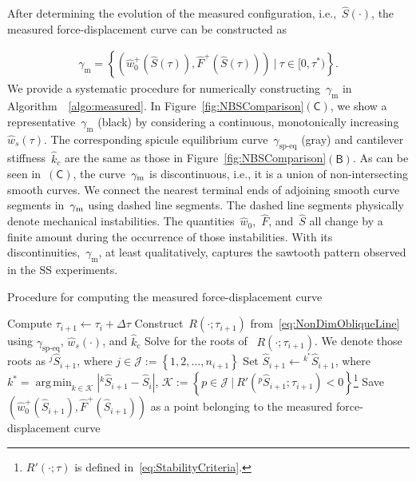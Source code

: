 \documentclass[preprint,10pt,times]{elsarticle}
\numberwithin{equation}{section}
\newcommand{\lsc}[2][\mathscr{l}]{{}^{ #1 }\! #2}
\newcommand{\pr}[1]{\left( #1 \right)}
\newcommand{\subf}[1]{\pr{\textsf{#1}}}
\DeclareMathOperator*{\argmin}{arg\,min} %
\begin{document}
After determining the evolution of the measured configuration, i.e.,~$\hat{S}\pr{\cdot}$,
the measured force-displacement curve can be constructed as

\begin{align}
\gamma_{\text{m}}=\left\{\pr{\hat{w}_0^{+}\pr{\hat{S}(\tau)},\hat{F}^{+}\pr{\hat{S}(\tau)}}~|~\tau\in [0,\tau^*)\right\}.
\label{eq:PredictedMeasuredCurve}
\end{align}We provide a systematic procedure for numerically constructing~$\gamma_{\text{m}}$
in Algorithm~~\ref{algo:measured}. In Figure~\ref{fig:NBSComparison}$\subf{C}$,
we show a representative~$\gamma_{\text{m}}$ (black) by considering
a continuous, monotonically increasing~$\hat{w}_s(\tau)$. The corresponding
spicule equilibrium curve~$\gamma_{\text{sp-eq}}$ (gray) and cantilever
stiffness~$\hat{k}_c$ are the same as those in Figure~\ref{fig:NBSComparison}$\subf{B}$.
As can be seen in~$\subf{C}$, the curve~$\gamma_{\rm m}$ is discontinuous,
i.e., it is a union of non-intersecting smooth curves. We connect
the nearest terminal ends of adjoining smooth curve segments in~$\gamma_{\rm m}$
using dashed line segments. The dashed line segments physically denote
mechanical instabilities. The quantities~$\hat{w}_0$,~$\hat{F}$,
and~$\hat{S}$ all change by a finite amount during the occurrence
of those instabilities. With its discontinuities,~$\gamma_{\text{m}}$,
at least qualitatively, captures the sawtooth pattern observed in
the SS experiments.

\begin{algorithm}[ht!]
\caption{Procedure for computing the measured force-displacement curve}
\label{algo:measured}
\noindent\begin{minipage}{\textwidth}\renewcommand\footnoterule{}
\begin{algorithmic}[1]
\State Compute $\tau_{i+1}\leftarrow\tau_{i} +\Delta\tau$
\State Construct~$R\pr{\cdot;\tau_{i+1}}$ from~\eqref{eq:NonDimObliqueLine} using $\gamma_{\text{sp-eq}}$, $\hat{w}_s (\cdot)$, and $\hat{k}_c$
\State Solve for the roots of ~$R\pr{\cdot;\tau_{i+1}}$. We denote those roots as $\lsc[j]{\hat{S}}_{i+1}$, where $j\in\mathcal{J}:=\left\{ 1,2,\dots,n_{i+1}\right\}$
\State Set $\hat{S}_{i+1}\leftarrow\lsc[k^*]{\hat{S}}_{i+1}$, where $ k^* =\argmin_{k\in\mathcal{K}}\left|\lsc[k]{\hat{S}}_{i+1} -  {\hat{S}}_{i}\right|$, $\mathcal{K}:=\left\{p\in\mathcal{J}~|~R'(\lsc[p]{\hat{S}}_{i+1};\tau_{i+1})<0\right\}$\footnote{$R'(\cdot;\tau)$ is defined in~\eqref{eq:StabilityCriteria}.}
\State Save  $\pr{\hat{w}_0^{+}\pr{\hat{S}_{i+1}},\hat{F}^{+}\pr{\hat{S}_{i+1}}}$ as a point belonging to the measured force-displacement curve
\EndFor
{}
\end{algorithmic}
\end{minipage}
\end{algorithm}
\end{document}
